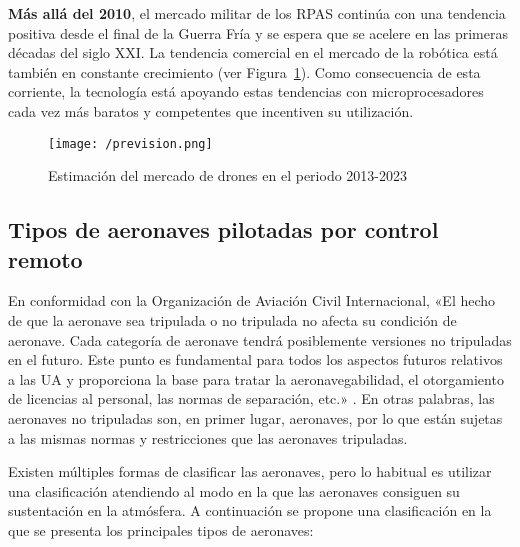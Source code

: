 \textbf{Más allá del 2010}, el mercado militar de los \acs{RPAS} continúa con una tendencia positiva desde el final de la Guerra Fría y se espera que se acelere en las primeras décadas del siglo XXI. La tendencia comercial en el mercado de la robótica está también en constante crecimiento (ver Figura~\ref{fig:prevision}). Como consecuencia de esta corriente, la tecnología está apoyando estas tendencias con microprocesadores cada vez más baratos y competentes que incentiven su utilización.

\begin{figure}[!h]
\begin{center}
\texttt{[image: /prevision.png]}
\caption[Estimación del mercado de drones en el periodo 2013-2023]{Estimación del mercado de drones en el periodo 2013-2023 \cite{prevision}}
\label{fig:prevision}
\end{center}
\end{figure}

\subsection{Tipos de aeronaves pilotadas por control remoto}
\label{sec:tipos}

En conformidad con la Organización de Aviación Civil Internacional, «El hecho de que la aeronave sea tripulada o no tripulada no afecta su condición de aeronave. Cada categoría de aeronave tendrá posiblemente versiones no tripuladas en el futuro.
Este punto es fundamental para todos los aspectos futuros relativos a las \acs{UA} y proporciona la base para tratar la aeronavegabilidad, el otorgamiento de licencias al personal, las normas de separación, etc.» \cite{OACI}. En otras palabras, las aeronaves no tripuladas son, en primer lugar, aeronaves, por lo que están sujetas a las mismas normas y restricciones que las aeronaves tripuladas.

Existen múltiples formas de clasificar las aeronaves, pero lo habitual es utilizar una clasificación atendiendo al modo en la que las aeronaves consiguen su sustentación en la atmósfera. A continuación se propone una clasificación en la que se presenta los principales tipos de aeronaves:  

